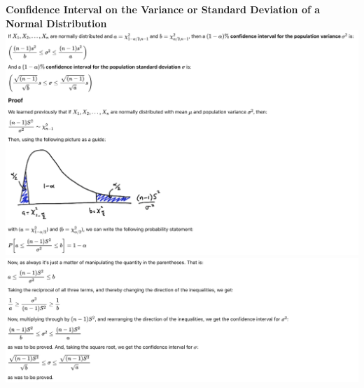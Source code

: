 \documentclass[]{article}
\begin{document}
\newline
\newline
\newline\newline
\newline
\newline
\newline\newline
\newline
\newline
\newline\newline
\newline
\newline
\newline
\newline
\newline
\newline
\newline
\newline
\newline
\newline
\newline
\newline
\newline
\newline
\Large\textbf{Confidence Interval on the Variance or Standard Deviation of \newline a Normal Distribution}
\newline
\newline\includegraphics[scale=0.55]{ci_var_sd}
\newline
\newline\includegraphics[scale=0.55]{ci_var_sd2}
 
\section{}
\end{document}
